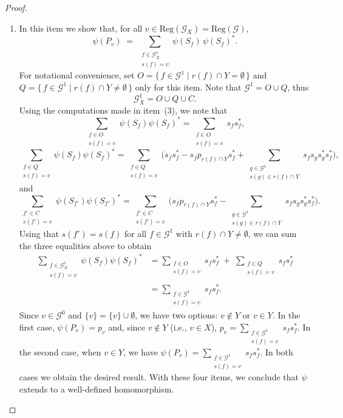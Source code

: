 \documentclass[12pt, reqno]{amsart}
\theoremstyle{definition}
\theoremstyle{remark}
\numberwithin{equation}{section}
\begin{document}
\begin{proof}
\begin{enumerate}
\item In this item we show that, for all $v \in \mathrm{Reg}(\mathcal{G}_X)=\mathrm{Reg}(\mathcal{G})$,
\[
\psi(P_v) \;=\; \sum_{\substack{f \in \mathcal{G}_X^1 \\ s(f) = v}} \psi(S_f)\, \psi(S_f)^*.
\]
For notational convenience, set $O = \{\,f \in \mathcal{G}^1 \mid r(f) \cap Y = \emptyset\,\}$ and
$Q = \{\,f \in \mathcal{G}^1 \mid r(f) \cap Y \neq \emptyset\,\}$ only for this item. Note that
$\mathcal{G}^1 = O \cup Q$, thus
\[
\mathcal{G}_X^1 = O \cup Q \cup C.
\]
Using the computations made in item~(3), we note that
\[
\sum_{\substack{f \in O \\ s(f) = v}} \psi(S_f) \psi(S_f)^*
=
\sum_{\substack{f \in O \\ s(f) = v}} s_f s_f^*,
\]
\[
\sum_{\substack{f \in Q \\ s(f) = v}} \psi(S_f) \psi(S_f)^*
=
\sum_{\substack{f \in Q \\ s(f) = v}}
\Big(
s_f s_f^*
-
s_f p_{r(f) \cap Y} s_f^*
+
\sum_{\substack{g \in \mathcal{G}^1 \\ s(g) \in r(f) \cap Y}}
s_f s_g s_g^* s_f^*
\Big),
\]
and
\[
\sum_{\substack{f' \in C \\ s(f') = v}} \psi(S_{f'}) \psi(S_{f'})^*
=
\sum_{\substack{f' \in C \\ s(f') = v}}
\Big(
s_f p_{r(f) \cap Y} s_f^*
-
\sum_{\substack{g \in \mathcal{G}^1 \\ s(g) \in r(f) \cap Y}}
s_f s_g s_g^* s_f^*
\Big).
\]
Using that $s(f') = s(f)$ for all $f \in \mathcal{G}^1$ with $r(f) \cap Y \neq \emptyset$, we can sum
the three equalities above to obtain
\begin{align*}
\sum_{\substack{f \in \mathcal{G}_X^1 \\ s(f) = v}} \psi(S_f) \psi(S_f)^*
&=
\sum_{\substack{f \in O \\ s(f) = v}} s_f s_f^*
\;+\;
\sum_{\substack{f \in Q \\ s(f) = v}} s_f s_f^* \\
&=
\sum_{\substack{f \in \mathcal{G}^1 \\ s(f) = v}} s_f s_f^*.
\end{align*}
Since $v \in \mathcal{G}^0$ and $\{v\} = \{v\} \cup \emptyset$, we have two options: $v \notin Y$ or
$v \in Y$. In the first case, $\psi(P_v) = p_v$ and, since $v \notin Y$ (i.e., $v \in X$),
$p_v = \sum_{\substack{f \in \mathcal{G}^1 \\ s(f) = v}} s_f s_f^*$. In the second case, when
$v \in Y$, we have $\psi(P_v) = \sum_{\substack{f \in \mathcal{G}^1 \\ s(f) = v}} s_f s_f^*$.
In both cases we obtain the desired result. With these four items, we conclude that $\psi$ extends
to a well-defined homomorphism.


\end{enumerate}
\end{proof}
\end{document}
